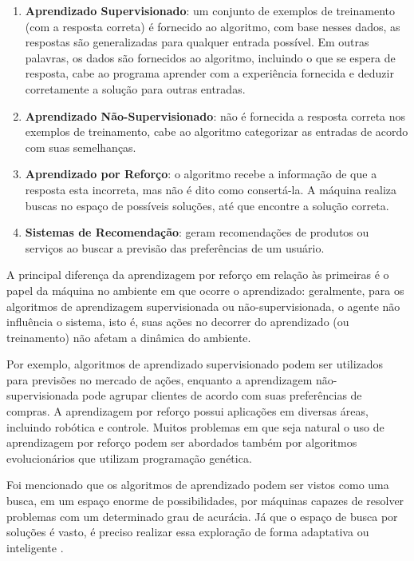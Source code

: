 \begin{enumerate}[label={\alph*)}]
\item \textbf{Aprendizado Supervisionado}: um conjunto de exemplos de treinamento (com a resposta correta) é fornecido ao algoritmo, com base nesses dados, as respostas são generalizadas para qualquer entrada possível. Em outras palavras, os dados são fornecidos ao algoritmo, incluindo o que se espera de resposta, cabe ao programa aprender com a experiência fornecida e deduzir corretamente a solução para outras entradas.
\item \textbf{Aprendizado Não-Supervisionado}: não é fornecida a resposta correta nos exemplos de treinamento, cabe ao algoritmo categorizar as entradas de acordo com suas semelhanças.
\item \textbf{Aprendizado por Reforço}: o algoritmo recebe a informação de que a resposta esta incorreta, mas não é dito como consertá-la. A máquina realiza buscas no espaço de possíveis soluções, até que encontre a solução correta.
\item \textbf{Sistemas de Recomendação}: geram recomendações de produtos ou serviços ao buscar a previsão das preferências de um usuário. 
\end{enumerate}

A principal diferença da aprendizagem por reforço em relação às primeiras é o papel da máquina no ambiente em que ocorre o aprendizado: geralmente, para os algoritmos de aprendizagem supervisionada ou não-supervisionada, o agente não influência o sistema, isto é, suas ações no decorrer do aprendizado (ou treinamento) não afetam a dinâmica do ambiente. 

Por exemplo, algoritmos de aprendizado supervisionado podem ser utilizados para previsões no mercado de ações, enquanto a aprendizagem não-supervisionada pode agrupar clientes de acordo com suas preferências de compras. A aprendizagem por reforço possui aplicações em diversas áreas, incluindo robótica e controle. Muitos problemas em que seja natural o uso de aprendizagem por reforço podem ser abordados também por algoritmos evolucionários que utilizam programação genética.

Foi mencionado que os algoritmos de aprendizado podem ser vistos como uma busca, em um espaço enorme de possibilidades, por máquinas capazes de resolver problemas com um determinado grau de acurácia. Já que o espaço de busca por soluções é vasto, é preciso realizar essa exploração de forma adaptativa ou inteligente \cite{koza92bookGp}.

